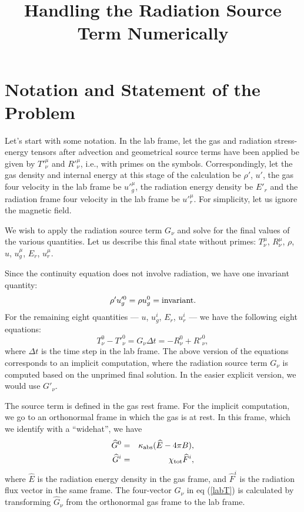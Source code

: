\documentclass[12pt,preprint]{aastex}
\begin{document}
                                              

\def\bE{\bar{E}}
\def\bR{\bar{R}}
\def\bu{\bar{u}}

\title{Handling the Radiation Source Term Numerically}

\section{Notation and Statement of the Problem}

Let's start with some notation. In the lab frame, let the gas and
radiation stress-energy tensors after advection and geometrical source
terms have been applied be given by $T'^\mu_\nu$ and $R'^\mu_\nu$,
i.e., with primes on the symbols. Correspondingly, let the gas density
and internal energy at this stage of the calculation be $\rho'$, $u'$,
the gas four velocity in the lab frame be $u'^\mu_g$, the radiation
energy density be $E'_r$ and the radiation frame four velocity in the
lab frame be $u'^\mu_r$. For simplicity, let us ignore the magnetic
field.

We wish to apply the radiation source term $G_\nu$ and solve for the
final values of the various quantities. Let us describe this final
state without primes: $T^\mu_\nu$, $R^\mu_\nu$, $\rho$, $u$,
$u^\mu_g$, $E_r$, $u^\mu_r$. 

Since the continuity equation does not involve radiation, we have one
invariant quantity:
\begin{equation}
\rho' u'^0_g = \rho u^0_g = {\rm invariant}.
\label{rho}
\end{equation}
For the remaining eight quantities --- $u$, $u^i_g$, $E_r$, $u^i_r$
--- we have the following eight equations:
\begin{equation}
T^0_\nu-T'^0_\nu = G_\nu \Delta t = -R^0_\nu+R'^0_\nu,
\label{labT}
\end{equation}
where $\Delta t$ is the time step in the lab frame.  The above version
of the equations corresponds to an implicit computation, where the
radiation source term $G_\nu$ is computed based on the unprimed final
solution. In the easier explicit version, we would use $G'_\nu$.

The source term is defined in the gas rest frame. For the implicit
computation, we go to an orthonormal frame in which the gas is at
rest.  In this frame, which we identify with a ``widehat'', we have
\begin{eqnarray}
\widehat{G}^0 &=& \kappa_{\rm abs}(\widehat{E}-4\pi B), \label{G0} \\
\widehat{G}^i &=& \chi_{\rm tot}\widehat{F}^i, \label{Gi}
\end{eqnarray}
where $\widehat{E}$ is the radiation energy density in the gas frame,
and $\widehat{F}^i$ is the radiation flux vector in the same
frame. The four-vector $G_\nu$ in eq (\ref{labT}) is calculated by
transforming $\widehat{G}_\nu$ from the orthonormal gas frame to the
lab frame.
\end{document}

